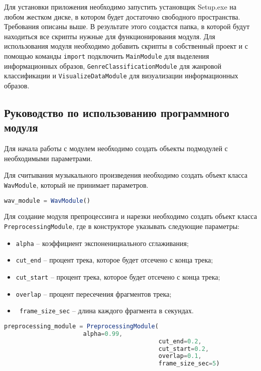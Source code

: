 Для установки приложения необходимо запустить установщик Setup.exe на любом жестком диске, в котором будет достаточно свободного пространства. Требования описаны выше. В результате этого создастся папка, в которой будут находиться все скрипты нужные для функционирования модуля. Для использования модуля необходимо добавить скрипты в собственный проект и с помощью команды \texttt{import} подключить \texttt{MainModule} для выделения информационных образов, \texttt{GenreClassificationModule} для жанровой классификации и  \texttt{VisualizeDataModule} для визуализации информационных образов.

\subsection{Руководство по использованию программного модуля}
\label{sub:manual:us}

Для начала работы с модулем необходимо создать объекты подмодулей с необходимыми параметрами. 

Для считывания музыкального произведения необходимо создать объект класса \texttt{WavModule}, который не принимает параметров.

\begin{lstlisting}[language=TypeScript, label=lst:testing:results]
	wav_module = WavModule()
\end{lstlisting}

Для создание модуля препроцессинга и нарезки необходимо создать объект класса \texttt{PreprocessingModule}, где в конструкторе указывать следующие параметры:
\begin{itemize} 
\item \texttt{alpha} -- коэффициент экспоненициального сглаживания;
\item \texttt{cut\_end} -- процент трека, которое будет отсечено с конца трека;
\item \texttt{cut\_start} -- процент трека, которое будет отсечено с конца трека;
\item \texttt{overlap} -- процент пересечения фрагментов трека;
\item \texttt{ frame\_size\_sec} -- длина каждого фрагмента в секундах.
\end{itemize}

\begin{lstlisting}[language=TypeScript, label=lst:testing:results]
	preprocessing_module = PreprocessingModule(
					  alpha=0.99,
                                           cut_end=0.2,
                                           cut_start=0.2,
                                           overlap=0.1,
                                           frame_size_sec=5)
\end{lstlisting}

